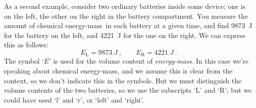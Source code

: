 \documentclass[a4paper,12pt,%
onecolumn,oneside,%
british%
]{memoir}
\renewcommand*{\|}[1][]{\nonscript\:#1\vert\nonscript\:\mathopen{}}
\newcommand*{\energym}{energy-mass}
\newcommand*{\yE}{E}
\begin{document}
\medskip

%
%
As a second example, consider two ordinary batteries inside some device; one is on the left, the other on the right in the battery compartment. You measure the amount of chemical \energym\ in each battery at a given time, and find \qty{9873}{J} for the battery on the left, and \qty{4221}{J} for the one on the right. We can express this as follows:
\begin{equation*}
  \yE_{\text{L}} = \qty{9873}{J} \ ,
  \qquad
  \yE_{\text{R}} = \qty{4221}{J} \ .
\end{equation*}
The symbol \enquote*{$\yE$} is used for the volume content of \emph{\energym}. In this case we're speaking about chemical \energym, and we assume this is clear from the context, so we don't indicate this in the symbols. But we must distinguish the volume contents of the two batteries, so we use the subscripts \enquote*{L} and \enquote*{R}; but we could have used \enquote*{l} and \enquote*{r}, or \enquote*{left} and \enquote*{right}.

\medskip
\end{document}
